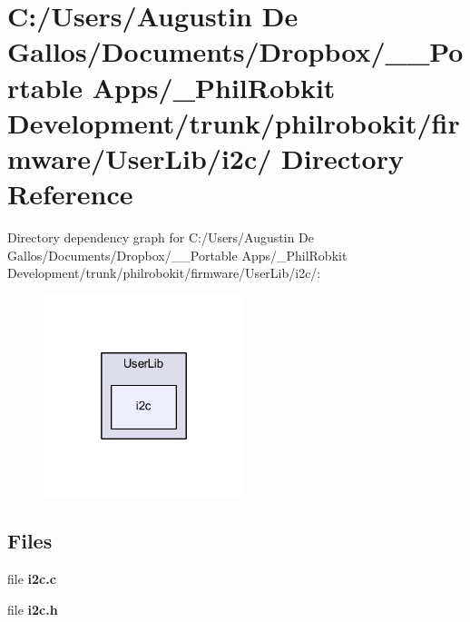 \section{C\-:/\-Users/\-Augustin De Gallos/\-Documents/\-Dropbox/\-\_\-\-\_\-\-Portable Apps/\-\_\-\-Phil\-Robkit Development/trunk/philrobokit/firmware/\-User\-Lib/i2c/ Directory Reference}
\label{dir_16b59794f6a97bd5df8218b10492ce2a}
Directory dependency graph for C\-:/\-Users/\-Augustin De Gallos/\-Documents/\-Dropbox/\-\_\-\-\_\-\-Portable Apps/\-\_\-\-Phil\-Robkit Development/trunk/philrobokit/firmware/\-User\-Lib/i2c/\-:\nopagebreak
\begin{figure}[H]
\begin{center}
\leavevmode
\includegraphics[width=166pt]{dir_16b59794f6a97bd5df8218b10492ce2a_dep}
\end{center}
\end{figure}
\subsection*{Files}
\begin{DoxyCompactItemize}
\item 
file {\bf i2c.\-c}
\item 
file {\bf i2c.\-h}
\end{DoxyCompactItemize}
